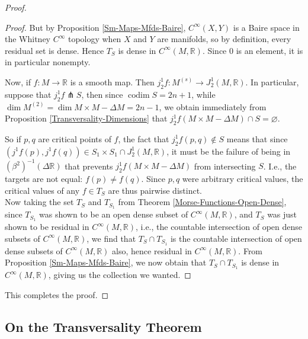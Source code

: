 \documentclass[reqno]{amsart}
\theoremstyle{definition}
\theoremstyle{remark}
\DeclareMathOperator{\codim}{codim}
\begin{document}
\begin{proof}
\begin{proof}
     But by Proposition \ref{Sm-Maps-Mfds-Baire},
     $C^{\infty}(X,Y)$ is a Baire space in the
     Whitney $C^{\infty}$ topology when
     $X$ and $Y$ are manifolds, so by
     definition, every residual set is dense. Hence
     $T_{S}$ is dense in
     $C^{\infty}(M,\mathbb{R})$. Since
     $0$ is an element, it is in particular nonempty.

  Now, if $f \colon M \to \mathbb{R}$ is a smooth map.
  Then $j_2^{1}f \colon
  M^{(s)} \to J_2^{1}(M, \mathbb{R})$.
  In particular,
  suppose that $j_2^{1}f \pitchfork S$, then since
  $\codim S = 2n+1$, while
  $\dim M^{(2)} =
  \dim M \times M - \Delta M= 2n-1 $, we obtain immediately from
  Proposition \ref{Transversality-Dimensions} that
  $j_2^{1}f( M \times M - \Delta M) \cap S = \varnothing$.

  So if $p,q$ are critical points of
  $f$, the fact that
  $j_2^{1}f(p,q) \not\in  S$ means that
  since $\left( j^{1}f(p), j^{1}f(q) \right)
  \in S_1 \times S_1 \cap J_2^{1}(M, \mathbb{R})$, it
  must be the failure of being in
  $\left( \beta^2 \right)^{-1}\left( \Delta \mathbb{R} \right) $
  that prevents $j_2^{1}f
  \left( M \times M- \Delta M \right) $  from intersecting
  $S$. I.e., the targets are not equal:
  $f(p) \neq f(q)$. Since $p,q$ were arbitrary
  critical values,
  the critical values of any
  $f \in T_S$ are thus pairwise distinct.\\

  Now taking the set
  $T_S$ and $T_{S_1}$ from Theorem \ref{Morse-Functions-Open-Dense},
  since $T_{S_1}$ was shown to be an open dense
  subset of $C^{\infty}(M,\mathbb{R})$, and
   $T_S$ was just shown to be
   residual in $C^{\infty}(M,\mathbb{R})$, i.e.,
   the countable intersection of open dense subsets
   of $C^{\infty}(M,\mathbb{R})$, we find that
   $T_S \cap T_{S_1}$ is the countable intersection of
   open dense subsets of $C^{\infty}(M,\mathbb{R})$ also,
   hence residual in $C^{\infty}(M,\mathbb{R})$.
   From Proposition \ref{Sm-Maps-Mfds-Baire}, we now obtain
   that $T_S \cap T_{S_1}$ is dense in
   $C^{\infty}(M,\mathbb{R})$, giving us
   the collection we wanted.






 \end{proof}

 This completes the proof.

 \end{proof}




    \subsection{On the Transversality Theorem}
\end{document}
